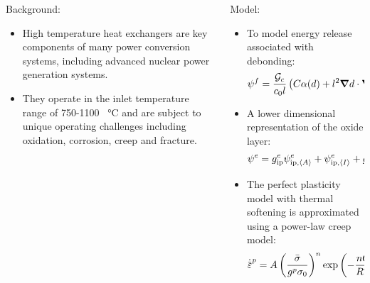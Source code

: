 \begin{frame}
\begin{columns}[T]
\begin{column}{0.5\textwidth}
      Background:
      \begin{itemize}
        \item \textcolor{peggyblue}{High temperature heat exchangers} are key components of many power conversion systems, including advanced nuclear power generation systems.
        \item They operate in the inlet temperature range of 750-1100 \SI{}{\celsius} and are subject to unique operating challenges including \textcolor{peggyblue}{oxidation}, \textcolor{peggyblue}{corrosion}, \textcolor{peggyblue}{creep} and \textcolor{peggyblue}{fracture}.
      \end{itemize}
    \end{column}
    \begin{column}{0.5\textwidth}
      Model:
      \begin{itemize}
        \item To model energy release associated with debonding:
              \begin{align*}
                \psi^f = \dfrac{\Gc}{c_0 l} \left( C\alpha(d) + l^2 \grad d \cdot \grad d \right) + \textcolor{peggyblue}{\dfrac{1}{\tau} \mathcal{G} \omega(c)}.
              \end{align*}
        \item A lower dimensional representation of the oxide layer:
              \begin{align*}
                \psi^e & =  g^e_\text{ip} \psi^e_{\text{ip}, {\left< A \right>}} + \psi^e_{\text{ip}, {\left< I \right>}} + g^e_\text{op} \psi^e_{\text{op}, {\left< A \right>}} + \psi^e_{\text{ip}, {\left< I \right>}}. 
              \end{align*}
        \item The perfect plasticity model with thermal softening is approximated using a power-law creep model:
              \begin{align*}
                \epdot = A \left( \dfrac{\bar{\sigma}}{g^p \sigma_0} \right)^n \exp\left( -\dfrac{nQ}{RT} \right).
              \end{align*}
      \end{itemize}
    \end{column}
  \end{columns}
\end{frame}

